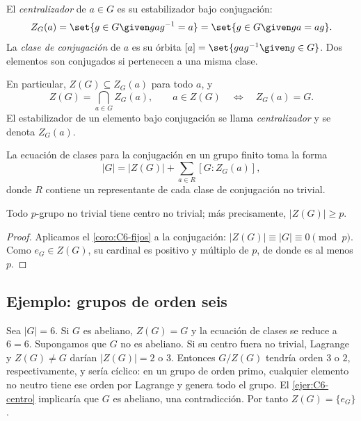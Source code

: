 \begin{defi}
El \emph{centralizador} de $a\in G$ es su estabilizador bajo conjugación:
\[
Z_G(a)=\set{g\in G\given gag^{-1}=a}
=\set{g\in G\given ga=ag}.
\]
La \emph{clase de conjugación} de $a$ es su órbita $[a]=\set{gag^{-1}\given g\in G}$. Dos elementos son conjugados si pertenecen a una misma clase.
\end{defi}
En particular, $Z(G)\subseteq Z_G(a)$ para todo $a$, y
\[
Z(G)=\bigcap_{a\in G}Z_G(a),\qquad
a\in Z(G)\quad\Longleftrightarrow\quad Z_G(a)=G.
\]
El estabilizador de un elemento bajo conjugación se llama \emph{centralizador} y se denota $Z_G(a)$.

La ecuación de clases para la conjugación en un grupo finito toma la forma
\begin{equation}\label{eq:C6-conjugacion}
|G|=|Z(G)|+\sum_{a\in R}[G:Z_G(a)],
\end{equation}
donde $R$ contiene un representante de cada clase de conjugación no trivial.

\begin{coro}\label{coro:C6-centro-p}
Todo $p$-grupo no trivial tiene centro no trivial; más precisamente, $|Z(G)|\ge p$.
\end{coro}
\begin{proof}
Aplicamos el \cref{coro:C6-fijos} a la conjugación: $|Z(G)|\equiv|G|\equiv0\pmod p$. Como $e_G\in Z(G)$, su cardinal es positivo y múltiplo de $p$, de donde es al menos $p$.
\end{proof}

\subsection{Ejemplo: grupos de orden seis}
Sea $|G|=6$. Si $G$ es abeliano, $Z(G)=G$ y la ecuación de clases se reduce a $6=6$. Supongamos que $G$ no es abeliano. Si su centro fuera no trivial, Lagrange y $Z(G)\ne G$ darían $|Z(G)|=2$ o $3$. Entonces $G/Z(G)$ tendría orden $3$ o $2$, respectivamente, y sería cíclico: en un grupo de orden primo, cualquier elemento no neutro tiene ese orden por Lagrange y genera todo el grupo. El \cref{ejer:C6-centro} implicaría que $G$ es abeliano, una contradicción. Por tanto $Z(G)=\{e_G\}$.

